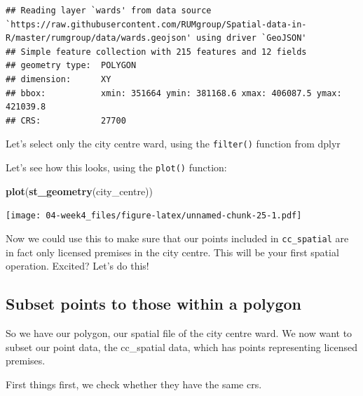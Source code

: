 \documentclass[]{book}
\newenvironment{Shaded}{\begin{snugshade}}{\end{snugshade}}
\newcommand{\KeywordTok}[1]{\textcolor[rgb]{0.13,0.29,0.53}{\textbf{#1}}}
\newcommand{\NormalTok}[1]{#1}
\newcommand{\OperatorTok}[1]{\textcolor[rgb]{0.81,0.36,0.00}{\textbf{#1}}}
\newcommand{\StringTok}[1]{\textcolor[rgb]{0.31,0.60,0.02}{#1}}
\begin{document}
\begin{verbatim}
## Reading layer `wards' from data source `https://raw.githubusercontent.com/RUMgroup/Spatial-data-in-R/master/rumgroup/data/wards.geojson' using driver `GeoJSON'
## Simple feature collection with 215 features and 12 fields
## geometry type:  POLYGON
## dimension:      XY
## bbox:           xmin: 351664 ymin: 381168.6 xmax: 406087.5 ymax: 421039.8
## CRS:            27700
\end{verbatim}

Let's select only the city centre ward, using the \texttt{filter()} function from dplyr

\begin{Shaded}
\end{Shaded}

Let's see how this looks, using the \texttt{plot()} function:

\begin{Shaded}
\begin{Highlighting}[]
\KeywordTok{plot}\NormalTok{(}\KeywordTok{st_geometry}\NormalTok{(city_centre))}
\end{Highlighting}
\end{Shaded}

\texttt{[image: 04-week4\_files/figure-latex/unnamed-chunk-25-1.pdf]}

Now we could use this to make sure that our points included in \texttt{cc\_spatial} are in fact only licensed premises in the city centre. This will be your first spatial operation. Excited? Let's do this!

\hypertarget{subset-points-to-those-within-a-polygon}{%
\subsection{Subset points to those within a polygon}\label{subset-points-to-those-within-a-polygon}}

So we have our polygon, our spatial file of the city centre ward. We now want to subset our point data, the cc\_spatial data, which has points representing licensed premises.

First things first, we check whether they have the same crs.
\end{document}
